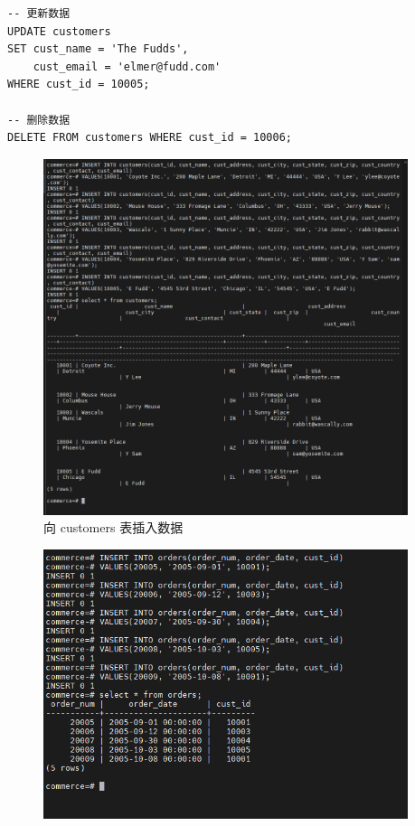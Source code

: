 \begin{enumerate}
\begin{center}
\begin{verbatim}
-- 更新数据
UPDATE customers
SET cust_name = 'The Fudds',
    cust_email = 'elmer@fudd.com'
WHERE cust_id = 10005;

-- 删除数据
DELETE FROM customers WHERE cust_id = 10006;
\end{verbatim}
\end{center}
\begin{figure}[H]
  \begin{center}
    \includegraphics[width=0.95\textwidth,scale=0.5]{./figures/insert_table_customers.png}
  \end{center}
  \caption{向 customers 表插入数据}
\end{figure}
\begin{figure}[H]
  \begin{center}
    \includegraphics[width=0.95\textwidth,scale=0.5]{./figures/insert_table_orders.png}

\end{center}
\end{figure}
\end{enumerate}
